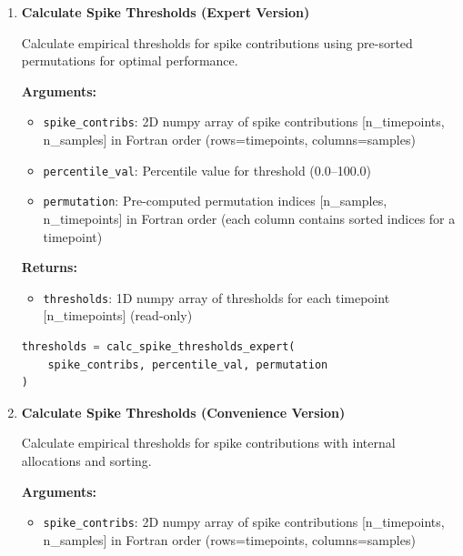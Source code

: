 \documentclass[11pt]{article}
\begin{document}
\begin{enumerate}
\begin{enumerate}
	      	\item \textbf{Calculate Spike Thresholds (Expert Version)}
	      	      
	      	      Calculate empirical thresholds for spike contributions using pre-sorted
	      	      permutations for optimal performance.
	      	      
	      	      \textbf{Arguments:}
	      	      \begin{itemize}
	      	      	\item \texttt{spike\_contribs}: 2D numpy array of spike contributions
	      	      	      [n\_timepoints, n\_samples] in Fortran order (rows=timepoints,
	      	      	      columns=samples)
	      	      	      
	      	      	\item \texttt{percentile\_val}: Percentile value for threshold (0.0--100.0)
	      	      	      
	      	      	\item \texttt{permutation}: Pre-computed permutation indices [n\_samples,
	      	      	n\_timepoints] in Fortran order (each column contains sorted indices
	      	      	for a timepoint)
	      	      \end{itemize}
	      	      \textbf{Returns:}
	      	      \begin{itemize}
	      	      	\item \texttt{thresholds}: 1D numpy array of thresholds for each timepoint
	      	      	      [n\_timepoints] (read-only)
	      	      \end{itemize}
	      	      \begin{lstlisting}[language=Python, caption={Spike Thresholds Calculation (Expert)}]
thresholds = calc_spike_thresholds_expert(
    spike_contribs, percentile_val, permutation
)
	      	      \end{lstlisting}
	      	      
	      	\item \textbf{Calculate Spike Thresholds (Convenience Version)}
	      	      
	      	      Calculate empirical thresholds for spike contributions with internal allocations
	      	      and sorting.
	      	      
	      	      \textbf{Arguments:}
	      	      \begin{itemize}
	      	      	\item \texttt{spike\_contribs}: 2D numpy array of spike contributions
	      	      	      [n\_timepoints, n\_samples] in Fortran order (rows=timepoints,
	      	      	      columns=samples)
	      	      	      

\end{itemize}
\end{enumerate}
\end{enumerate}
\end{document}
